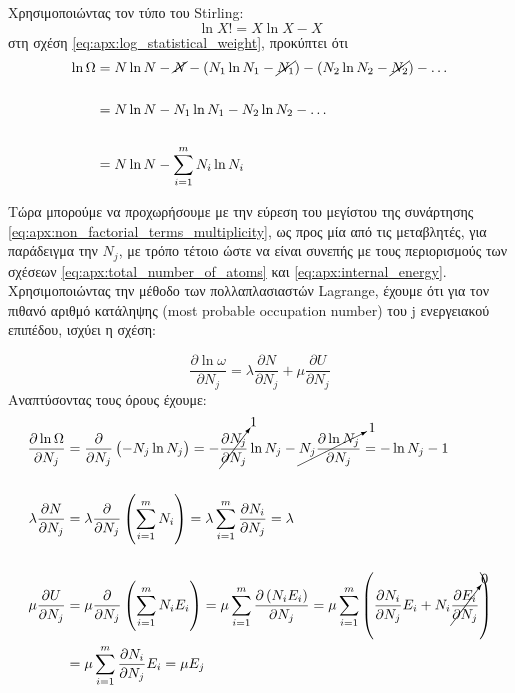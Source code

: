 Χρησιμοποιώντας τον τύπο του Stirling:
\begin{equation}
    \label{eq:apx:stirling_formula}
     \ln{X!} = X \ln{X} - X
\end{equation}
στη σχέση \eqref{eq:apx:log_statistical_weight}, προκύπτει ότι
\begin{align}
    \label{eq:apx:non_factorial_terms_multiplicity}
   \nonumber  \ln{\Omega} &=  N \ln{N} - \cancel{ N} - (N_1 \ln{N_1} - \cancel{ N_1}) - (N_2 \ln{N_2} - \cancel{ N_2}) - \dots \\\nonumber \\
   \nonumber &=  N \ln{ N} -  N_1 \ln{ N_1} -  N_2 \ln{  N_2} - \dots \\ \nonumber \\
   &=  N \ln{N} - \sum_{i=1}^{m} N_i \ln{N_i}
\end{align}

Τώρα μπορούμε να προχωρήσουμε με την εύρεση του μεγίστου της συνάρτησης \eqref{eq:apx:non_factorial_terms_multiplicity}, ως προς μία από τις μεταβλητές, για παράδειγμα την $ N_j$, με τρόπο τέτοιο ώστε να είναι συνεπής με τους περιορισμούς των σχέσεων \eqref{eq:apx:total_number_of_atoms} και \eqref{eq:apx:internal_energy}. Χρησιμοποιώντας την μέθοδο των πολλαπλασιαστών Lagrange, έχουμε ότι για τον πιθανό αριθμό κατάληψης (most probable occupation number) του j ενεργειακού επιπέδου, ισχύει η σχέση:

\begin{equation}
    \label{eq:apx:occupation_number_condition}
     \frac{\partial \ln{\omega}}{\partial N_j} = \lambda \frac{\partial N}{\partial N_j} + \mu \frac{\partial U}{\partial N_j}
\end{equation}
Αναπτύσοντας τους όρους έχουμε:
\begin{align*}
    \frac{\partial \ln{\Omega}}{\partial N_j} &= \frac{\partial}{\partial N_j} \left( -N_j \ln{N_j}\right) = -\cancelto{1}{\frac{\partial N_j}{\partial N_j}} \ln{N_j} - \cancelto{1}{N_j \frac{\partial \ln{N_j}}{\partial N_j}} = - \ln{N_j} - 1 \\\\
    \lambda \frac{\partial N}{\partial N_j} &= \lambda \frac{\partial}{\partial N_j} \left( \sum_{i=1}^{m} N_i \right) = \lambda \sum_{i=1}^{m} \frac{\partial N_i}{\partial N_j} = \lambda \\\\
    \mu \frac{\partial U}{\partial N_j} &= \mu \frac{\partial}{\partial N_j} \left( \sum_{i=1}^{m} N_i E_i \right) = \mu \sum_{i=1}^{m} \frac{\partial \left( N_i E_i \right)}{\partial N_j} = \mu \sum_{i=1}^{m} \left( \frac{\partial N_i}{\partial N_j} E_i + N_i \cancelto{0}{\frac{\partial E_i}{\partial N_j}} \right) \\  
    &= \mu \sum_{i=1}^{m} \frac{\partial N_i}{\partial N_j}E_i = \mu E_j
\end{align*}

